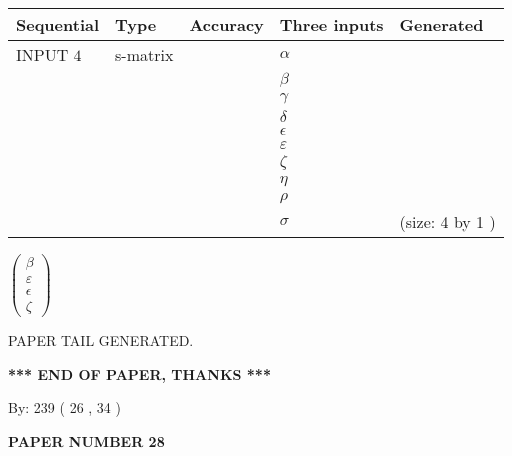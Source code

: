 \documentclass[12pt]{article}
\begin{document}
  
\noindent\begin{tabular}{|l|l|l|l|l|}
\hline
 Sequential & Type & Accuracy & Three inputs & Generated \\ 
\hline
 
 
  INPUT $            4 $ & s-matrix & & 
 $  \alpha $ & 
  \\
  & & & 
 $  \beta $ & 
  \\
  & & & 
 $  \gamma $ & 
  \\
  & & & 
 $  \delta $ & 
  \\
  & & & 
 $  \epsilon $ & 
  \\
  & & & 
 $  \varepsilon $ & 
  \\
  & & & 
 $                     \zeta $ & 
  \\
  & & & 
 $  \eta $ & 
  \\
  & & & 
 $  \rho $ & 
  \\
  & & & 
 $  \sigma $ & 
  (size:            4  by            1 )
 \\  \hline  
 \end{tabular}
   
   
 $  \left( \begin{array}
 {
 c
 }
 \beta \\ 
 \varepsilon \\ 
 \epsilon \\ 
                    \zeta
 \end{array} \right) $ 
   
   
   
   
 \vspace{0.2in}
 
   
   
\vspace{2.0in} PAPER TAIL GENERATED.
   
   
   
   
\vspace{1.0in} 
{\textbf{\large{ *** END OF PAPER, THANKS *** }}} 
   
   
\hspace{1.0in} By: 
         239 (          26 ,           34 )
   
   
   
   
\newpage 
\setcounter{page}{ 
    28001 } 
   
   
   
   
 {\textbf{ \Large{ PAPER NUMBER           28  }}}
   
   
\vspace{0.2in}
   
\end{document}
